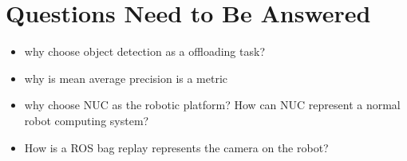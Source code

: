 \chapter{Questions Need to Be Answered}

\begin{itemize}
    \item why choose object detection as a offloading task? 
    \item why is mean average precision is a metric
    \item why choose NUC as the robotic platform? How can NUC represent a normal robot computing system?
    \item How is a ROS bag replay represents the camera on the robot?
\end{itemize}